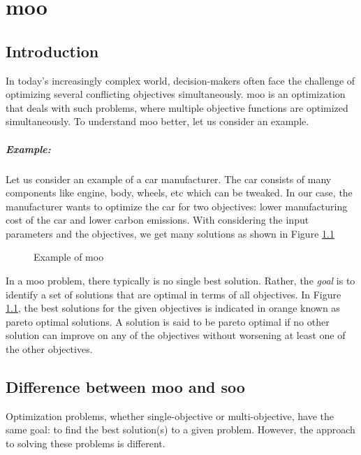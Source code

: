 \chapter{\acrlong{moo}}

\section{Introduction} \label{what is moo}
In today's increasingly complex world, decision-makers often face the challenge of optimizing several conflicting objectives simultaneously. \acrfull{moo} 
is an optimization that deals with such problems, where multiple objective functions are optimized simultaneously. To understand \acrshort{moo} better, 
let us consider an example.

\paragraph{Example:}
Let us consider an example of a car manufacturer. The car consists of many components like engine, body, wheels, etc which can be
tweaked. In our case, the manufacturer wants to optimize the car for two objectives: lower manufacturing cost of the car and lower carbon emissions. With 
considering the input parameters and the objectives, we get many solutions as shown in Figure \ref{moo}

\begin{figure}[!h]
	\begin{center}
		
	\end{center}
    \caption{Example of \acrshort{moo}}
    \label{moo}
\end{figure}
In a \acrshort{moo} problem, there typically is no single best solution. Rather, the \textit{goal} is to identify a set of solutions that are optimal in terms 
of all objectives. In Figure \ref{moo}, the best solutions for the given objectives is indicated in orange known as pareto optimal solutions. A solution is said 
to be pareto optimal if no other solution can improve on any of the objectives without worsening at least one of the other objectives.

\section{Difference between \acrshort{moo} and \acrshort{soo}}
Optimization problems, whether single-objective or multi-objective, have the same goal: to find the best solution(s) to a given problem. However, the approach
to solving these problems is different. 

